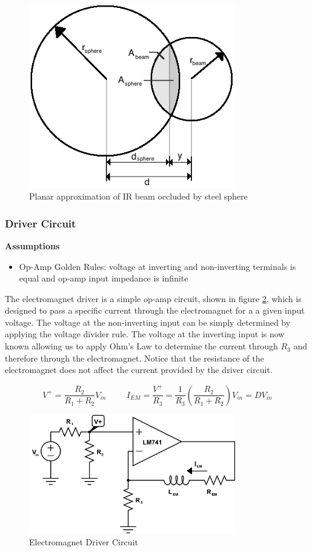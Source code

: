 \documentclass{article}
\theoremstyle{plain}
\theoremstyle{definition}
\theoremstyle{remark}
\begin{document}
\begin{figure}
\begin{center}
\includegraphics[width = 9cm]{beam_sphere_diagram.png}
\caption{Planar approximation of IR beam occluded by steel sphere}
\label{Q1_a1}
\end{center}
\end{figure}

\subsubsection*{Driver Circuit}
\textbf{Assumptions}
\begin{itemize}
\item Op-Amp Golden Rules: voltage at inverting and non-inverting terminals is equal and op-amp input impedance is infinite
\end{itemize}

The electromagnet driver is a simple op-amp circuit, shown in figure \ref{Q1_a2}, which is designed to pass a specific current through the electromagnet for a a given input voltage.  The voltage at the non-inverting input can be simply determined by applying the voltage divider rule.  The voltage at the inverting input is now known allowing us to apply Ohm's Law to determine the current through $R_{3}$ and therefore through the electromagnet.  Notice that the resistance of the electromagnet does not affect the current provided by the driver circuit.

$$ V^{+}=\frac{R_2}{R_1+R_2}V_{in} \hspace{1cm} I_{EM}=\frac{V^{+}}{R_3}=\frac{1}{R_3}\left(\frac{R_2}{R_1+R_2}\right)V_{in} = DV_{in}$$

\begin{figure}
\begin{center}
\includegraphics[width = 9cm]{em_driver_circuit.png}
\end{center}
\label{Q1_a2}
\caption{Electromagnet Driver Circuit}
\end{figure}
\end{document}
